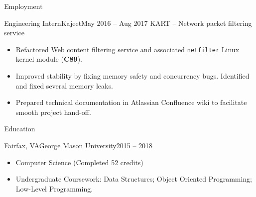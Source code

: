 \documentclass[]{mcdowellcv}
\begin{document}
\begin{cvsection}{Employment}
        \begin{cvsubsection}{Engineering Intern}{Kajeet}{May 2016 -- Aug 2017}
            KART -- Network packet filtering service
            \begin{itemize}
                \item Refactored Web content filtering service and associated \texttt{netfilter} Linux kernel module (\textbf{C89}).
                \item Improved stability by fixing memory safety and concurrency bugs. Identified and fixed several memory leaks.
                \item Prepared technical documentation in Atlassian Confluence wiki to facilitate smooth project hand-off.
            \end{itemize}
        \end{cvsubsection}
    \end{cvsection}
    
    \begin{cvsection}{Education}
        \begin{cvsubsection}{Fairfax, VA}{George Mason University}{2015 -- 2018}
            \begin{itemize}
                \item Computer Science (Completed 52 credits)
                \item Undergraduate Coursework: Data Structures; Object Oriented Programming; Low-Level Programming.
            \end{itemize}
        \end{cvsubsection}
    \end{cvsection}
    
\end{document}
